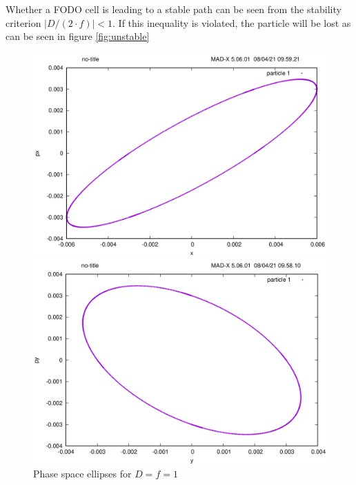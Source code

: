 Whether a FODO cell is leading to a stable path can be seen from the stability criterion $|D/(2\cdot f)|<1$.
If this inequality is violated, the particle will be lost as can be seen in figure \ref{fig:unstable}
\begin{figure}
    \centering
    \begin{minipage}{0.49\textwidth}
        \includegraphics[width=\textwidth]{../../part1/d1f1_x.png}
    \end{minipage}\hfill
    \begin{minipage}{0.49\textwidth}
        \centering
        \includegraphics[width=\textwidth]{../../part1/d1f1_y.png}
    \end{minipage}
    \caption{Phase space ellipses for $D=f=1$}
    \label{fig:ellipse}
\end{figure}
